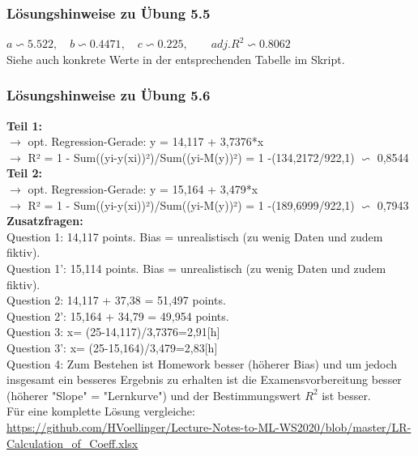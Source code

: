 \documentclass[12pt]{article}
\begin{document}
\subsubsection{Lösungshinweise zu Übung 5.5}
%
$ a \backsim 5.522, \quad b \backsim 0.4471, \quad c \backsim 0.225, \qquad adj.R^2 \backsim 0.8062 $\\[0.2cm]
Siehe auch konkrete Werte in der entsprechenden Tabelle im Skript.
%
\subsubsection{Lösungshinweise zu Übung 5.6}
%
\textbf{Teil 1:}\\
$\rightarrow$ opt. Regression-Gerade:  y =  14,117 + 3,7376*x \\[0.3cm]
$\rightarrow$ R² = 1 - Sum((yi-y(xi))²)/Sum((yi-M(y))²) = 1 -(134,2172/922,1) $\backsim $ 0,8544 \\[0.3cm]	
%				
\textbf{Teil 2:}\\
$\rightarrow$ opt. Regression-Gerade:  y =  15,164 + 3,479*x \\[0.3cm]
$\rightarrow$ R² = 1 - Sum((yi-y(xi))²)/Sum((yi-M(y))²) = 1 -(189,6999/922,1) $\backsim $ 0,7943 \\[0.3cm]	
%				
							
\textbf{Zusatzfragen:}\\
%
Question 1:   14,117 points. Bias = unrealistisch (zu wenig Daten und zudem fiktiv).	\\[0.1cm]
Question 1': 15,114 points. Bias = unrealistisch (zu wenig Daten und zudem fiktiv).	\\[0.1cm]		
Question 2:  14,117 + 37,38 = 51,497 points.\\[0.1cm]
Question 2': 15,164 + 34,79 = 49,954 points.\\[0.1cm]		
Question 3:  x= (25-14,117)/3,7376=2,91[h] \\[0.3cm]	
Question 3': x= (25-15,164)/3,479=2,83[h] \\[0.3cm]	
Question 4: Zum Bestehen ist Homework besser (höherer Bias) und um jedoch insgesamt ein besseres Ergebnis zu erhalten ist die Examensvorbereitung besser (höherer "Slope" = "Lernkurve") und der Bestimmungswert $R^2$ ist besser.\\[0.3cm]	

\hspace*{1.0cm}Für eine komplette Lösung vergleiche: \\
\url{https://github.com/HVoellinger/Lecture-Notes-to-ML-WS2020/blob/master/LR-Calculation_of_Coeff.xlsx}\\[0.4cm]	
\end{document}
